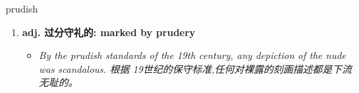 
\begin{frame}
{\huge prudish}
\begin{center}
\begin{enumerate}\Large
  \item \textbf{adj. 过分守礼的: marked by prudery}
  \begin{itemize}
    \item \em{\Large{By the prudish standards of the 19th century, any depiction of the nude was scandalous. 根据 19世纪的保守标准,任何对裸露的刻画描述都是下流无耻的。}}
  \end{itemize}
\end{enumerate}
\end{center}
\end{frame}
